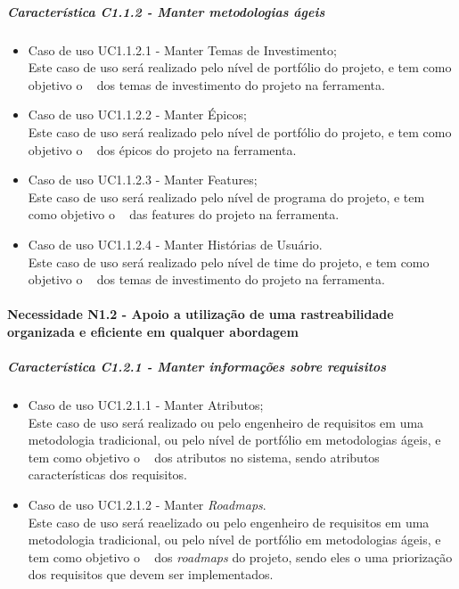 	\subparagraph{Característica C1.1.2 - Manter metodologias ágeis}
		\begin{itemize}
			\item Caso de uso UC1.1.2.1 - Manter Temas de Investimento;\\
				Este caso de uso será realizado pelo nível de portfólio do projeto, e tem como objetivo o \CRUD~ dos temas de investimento do projeto na ferramenta.
			\item Caso de uso UC1.1.2.2 - Manter Épicos;\\
				Este caso de uso será realizado pelo nível de portfólio do projeto, e tem como objetivo o \CRUD~ dos épicos do projeto na ferramenta.
			\item Caso de uso UC1.1.2.3 - Manter Features;\\
				Este caso de uso será realizado pelo nível de programa do projeto, e tem como objetivo o \CRUD~ das features do projeto na ferramenta.
			\item Caso de uso UC1.1.2.4 - Manter Histórias de Usuário.\\
				Este caso de uso será realizado pelo nível de time do projeto, e tem como objetivo o \CRUD~ dos temas de investimento do projeto na ferramenta.
		\end{itemize}

\paragraph{Necessidade N1.2 - Apoio a utilização de uma rastreabilidade organizada e eficiente em qualquer abordagem}
	\subparagraph{Característica C1.2.1 - Manter informações sobre requisitos}
		\begin{itemize}
			\item Caso de uso UC1.2.1.1 - Manter Atributos;\\
				Este caso de uso será realizado ou pelo engenheiro de requisitos em uma metodologia tradicional, ou pelo nível de portfólio em metodologias ágeis, e tem como objetivo o \CRUD~ dos atributos no sistema, sendo atributos características dos requisitos.
			\item Caso de uso UC1.2.1.2 - Manter \textit{Roadmaps}.\\
				Este caso de uso será reaelizado ou pelo engenheiro de requisitos em uma metodologia tradicional, ou pelo nível de portfólio em metodologias ágeis, e tem como objetivo o \CRUD~ dos \textit{roadmaps} do projeto, sendo eles o uma priorização dos requisitos que devem ser implementados.

		\end{itemize}


